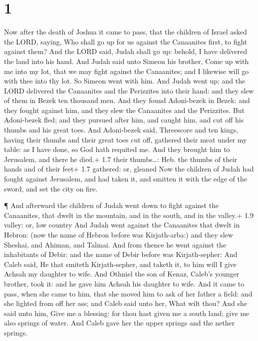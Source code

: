 \hypertarget{section}{%
\section{1}\label{section}}

 Now after the death of Joshua it came to pass, that the
children of Israel asked the LORD, saying, Who shall go up for us
against the Canaanites first, to fight against them?  And
the LORD said, Judah shall go up: behold, I have delivered the land into
his hand.  And Judah said unto Simeon his brother, Come up
with me into my lot, that we may fight against the Canaanites; and I
likewise will go with thee into thy lot. So Simeon went with him.
 And Judah went up; and the LORD delivered the Canaanites
and the Perizzites into their hand: and they slew of them in Bezek ten
thousand men.  And they found Adoni-bezek in Bezek: and they
fought against him, and they slew the Canaanites and the Perizzites.
 But Adoni-bezek fled; and they pursued after him, and
caught him, and cut off his thumbs and his great toes.  And
Adoni-bezek said, Threescore and ten kings, having their thumbs and
their great toes cut off, gathered their meat under my table: as I have
done, so God hath requited me. And they brought him to Jerusalem, and
there he died.+ 1.7 their thumbs\ldots: Heb. the thumbs of their hands
and of their feet+ 1.7 gathered: or, gleaned  Now the
children of Judah had fought against Jerusalem, and had taken it, and
smitten it with the edge of the sword, and set the city on fire.

 ¶ And afterward the children of Judah went down to fight
against the Canaanites, that dwelt in the mountain, and in the south,
and in the valley.+ 1.9 valley: or, low country  And Judah
went against the Canaanites that dwelt in Hebron: (now the name of
Hebron before was Kirjath-arba:) and they slew Sheshai, and Ahiman, and
Talmai.  And from thence he went against the inhabitants of
Debir: and the name of Debir before was Kirjath-sepher: 
And Caleb said, He that smiteth Kirjath-sepher, and taketh it, to him
will I give Achsah my daughter to wife.  And Othniel the
son of Kenaz, Caleb's younger brother, took it: and he gave him Achsah
his daughter to wife.  And it came to pass, when she came
to him, that she moved him to ask of her father a field: and she lighted
from off her ass; and Caleb said unto her, What wilt thou? 
And she said unto him, Give me a blessing: for thou hast given me a
south land; give me also springs of water. And Caleb gave her the upper
springs and the nether springs.

